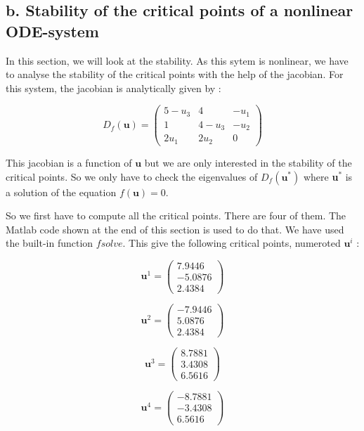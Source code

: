 \subsection*{b. Stability of the critical points of a nonlinear ODE-system}

In this section, we will look at the stability. As this sytem is nonlinear, we have to analyse the stability of the critical points with the help of the jacobian. For this system, the jacobian is analytically given by : 

$$D_f(\textbf{u}) = \left(\begin{array}{ccc}
5-u_3 & 4 & -u_1 \\ 
1 & 4-u_3 & -u_2 \\ 
2u_1 & 2u_2 & 0
\end{array} \right)$$

This jacobian is a function of $\textbf{u}$ but we are only interested in the stability of the critical points. So we only have to check the eigenvalues of $D_f(\textbf{u}^*)$ where \textbf{u$^*$} is a solution of the equation $f(\textbf{u})=0$.

So we first have to compute all the critical points. There are four of them. The Matlab code shown at the end of this section is used to do that. We have used the built-in function $fsolve$. This give the following critical points, numeroted $\textbf{u}^i$ : 

$$
\textbf{u}^1 = \begin{pmatrix} 7.9446 \\ 
-5.0876 \\
 2.4384 
 \end{pmatrix}$$
 
 $$\textbf{u}^2 = \begin{pmatrix} -7.9446 \\ 
5.0876 \\
 2.4384 
 \end{pmatrix}$$
 
 $$\textbf{u}^3 = \begin{pmatrix} 8.7881 \\ 
3.4308 \\
 6.5616 
 \end{pmatrix}$$
 
 $$\textbf{u}^4 = \begin{pmatrix} -8.7881 \\ 
-3.4308 \\
 6.5616 
 \end{pmatrix}$$

